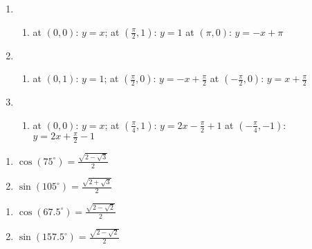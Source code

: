 \documentclass{ximera}
\begin{document}
\begin{enumerate}

\setcounter{enumi}{\value{HW}}

\addtocounter{enumi}{15}

\item  \begin{enumerate}   \addtocounter{enumii}{3}

\item   at $(0,0)$:  $y = x$;  at $\left(\frac{\pi}{2}, 1\right)$:  $y = 1$   at $(\pi, 0)$:  $y = -x + \pi$

\end{enumerate}

\item  \begin{enumerate}   \addtocounter{enumii}{3}

\item   at $(0,1)$:  $y = 1$;  at $\left(\frac{\pi}{2}, 0\right)$:  $y = -x + \frac{\pi}{2}$   at $\left(-\frac{\pi}{2}, 0\right)$:  $y = x + \frac{\pi}{2}$

\end{enumerate}


\item  \begin{enumerate}   \addtocounter{enumii}{4}

\item   at $(0,0)$:  $y = x$;  at $\left(\frac{\pi}{4}, 1\right)$:  $y = 2x - \frac{\pi}{2} +1$   at $\left(-\frac{\pi}{4}, -1\right)$:  $y = 2x + \frac{\pi}{2} - 1$

\end{enumerate}

\setcounter{HW}{\value{enumi}}
\end{enumerate}

\begin{multicols}{2}

\begin{enumerate}
\setcounter{enumi}{\value{HW}}

\item $\cos(75^{\circ}) = \frac{\sqrt{2-\sqrt{3}}}{2}$ 
\item $\sin(105^{\circ}) = \frac{\sqrt{2+\sqrt{3}}}{2}$ 

\setcounter{HW}{\value{enumi}}

\end{enumerate}

\end{multicols}

\begin{multicols}{2}

\begin{enumerate}

\setcounter{enumi}{\value{HW}}

\item $\cos(67.5^{\circ})  = \frac{\sqrt{2-\sqrt{2}}}{2}$ 
\item $\sin(157.5^{\circ}) = \frac{\sqrt{2-\sqrt{2}}}{2}$ 

\setcounter{HW}{\value{enumi}}

\end{enumerate}

\end{multicols}
\end{document}
